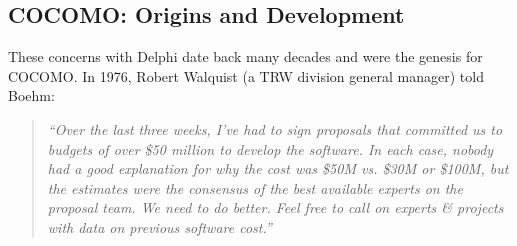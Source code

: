 \documentclass{sig-alternate}
\begin{document}
\subsection{COCOMO: Origins and Development}
These concerns with  Delphi  date
back many decades and were the genesis for  COCOMO. In 1976, Robert Walquist (a TRW division general manager)
told  Boehm: \begin{quote}{\em ``Over the last three
weeks, I've had to sign proposals that committed us
to budgets of over \$50 million to develop the
software.  In each case, nobody had a good
explanation for why the cost was \$50M vs. \$30M or
\$100M, but the estimates were the consensus of the
best available experts on the proposal team.  We
need to do better. Feel free to call on experts
\& projects with data on previous software cost.''}\end{quote}
\end{document}
